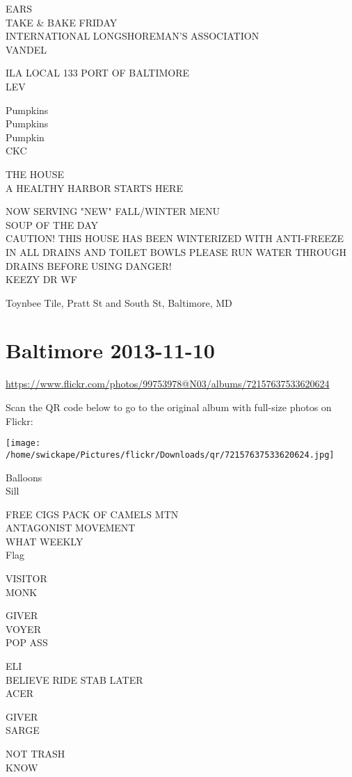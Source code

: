 \documentclass[10pt,letterpaper]{article}
\begin{document}
EARS\\
TAKE \& BAKE FRIDAY\\
INTERNATIONAL LONGSHOREMAN'S ASSOCIATION\\
VANDEL

ILA LOCAL 133 PORT OF BALTIMORE\\
LEV

Pumpkins\\
Pumpkins\\
Pumpkin\\
CKC

THE HOUSE\\
A HEALTHY HARBOR STARTS HERE

NOW SERVING "NEW" FALL/WINTER MENU\\
SOUP OF THE DAY\\
CAUTION! THIS HOUSE HAS BEEN WINTERIZED WITH ANTI{-}FREEZE IN ALL DRAINS AND TOILET BOWLS PLEASE RUN WATER THROUGH DRAINS BEFORE USING DANGER!\\
KEEZY DR WF

Toynbee Tile, Pratt St and South St, Baltimore, MD


\section*{Baltimore 2013-11-10}

\url{https://www.flickr.com/photos/99753978@N03/albums/72157637533620624}

Scan the QR code below to go to the original album with full-size photos on Flickr:

\texttt{[image: /home/swickape/Pictures/flickr/Downloads/qr/72157637533620624.jpg]}


Balloons\\
Sill

FREE CIGS PACK OF CAMELS MTN\\
ANTAGONIST MOVEMENT\\
WHAT WEEKLY\\
Flag

VISITOR\\
MONK

GIVER\\
VOYER\\
POP ASS

ELI\\
BELIEVE RIDE STAB LATER\\
ACER

GIVER\\
SARGE

NOT TRASH\\
KNOW
\end{document}
